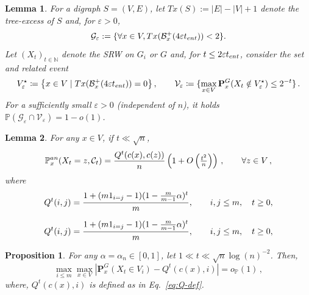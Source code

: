 \documentclass[10pt,a4paper]{amsart}
\newtheorem{proposition}{Proposition}
\newtheorem{lemma}{Lemma}
\newcommand{\N}{\mathbb{N}}
\newcommand{\eps}{\varepsilon}
\newcommand{\one}{\textup{\textbf{1}}}
\newcommand{\op}{o_{\p}}
\newcommand{\p}{\mathbb{P}}
\newcommand{\pan}{\p^{\textup{an}}}
\newcommand{\quenchG}{\mathbf{P}^G}
\newcommand{\semi}{{Q}}
\newcommand{\tent}{t_{\textup{ent}}}
\newcommand{\trex}{\textit{Tx}}
\newcommand{\veps}{V^{\star}_\eps}
\begin{document}
	\begin{lemma}\label{lemma:tree-like}
	For a digraph $S=(V,E)$, let $\trex(S):= |E|-|V|+1$ denote the tree-excess of $S$ and, for $\eps>0$,
	\begin{equation} \label{eq:G+}  
			\mathcal{G}_\eps:=\{\forall x \in V,\trex(\mathcal{B}^+_x({4\eps\tent}))< 2 \}.
	\end{equation}
	Let $(X_t)_{t \in \N}$ denote the SRW on $G_i$ or $G$ and, for $t \le {2\eps\tent}$, consider the set and related event
	\begin{align} \label{eq:Veps}
		\veps \coloneqq \left\{ x \in V \mid \trex(\mathcal{B}^+_{x}({4\eps\tent}))=0 \right\}
		, \qquad
		\mathcal{V}_{\eps}\coloneqq \{\max_{x \in V} \quenchG_x(X_t \notin \veps)\le 2^{-t}\}\,.
	\end{align}
	For a sufficiently small $\eps>0$ (independent of $n$), it holds $\p\left(\mathcal{G}_\eps \cap  \mathcal{V}_{\eps}\right) = 1-o(1)$.
\end{lemma}

\begin{lemma} \label{lemma:annealed-law}
For any $x\in V$, if $t \ll \sqrt{n}$,
\begin{equation}
	\pan_x(X_t=z,\mathcal{C}_t)=\frac{\semi^t(c(x),c(z))}{n}\left(1+O\left(\tfrac{t^2}{n}\right)\right)\,,\qquad \forall z\in V\,,
\end{equation}
where 
\begin{equation} \label{eq:Q-def}
	\semi^ t(i,j) = \frac{1+(m\one_{i=j}-1)(1-\frac{m}{m-1}\alpha)^{t}}{m}, \qquad i,j \le m, \quad t\ge0,
\end{equation}

\end{lemma}

\begin{equation} 
	\semi^ t(i,j) = \frac{1+(m\one_{i=j}-1)(1-\frac{m}{m-1}\alpha)^{t}}{m}, \qquad i,j \le m, \quad t\ge0,
\end{equation}

    \begin{proposition} \label{prop:quenched-law}
		For any $\alpha=\alpha_n\in[0,1]$, let $1\ll t \ll \sqrt{n}\log(n)^{-2} $. Then, 
		\begin{equation}\label{eq:315}
		\max_{i \le m}\max_{x \in V}
		\left| \quenchG_x(X_t \in V_i) - \semi^t(c(x),i)\right|
		=\op(1)\,,
		\end{equation}
		where, $\semi^t(c(x),i)$ is defined as in Eq.~\eqref{eq:Q-def}.
	\end{proposition}
\end{document}
